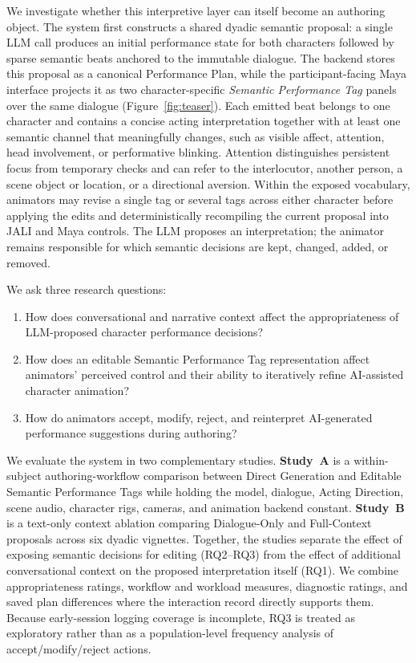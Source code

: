 We investigate whether this interpretive layer can itself become an authoring object. The system first constructs a shared dyadic semantic proposal: a single LLM call produces an initial performance state for both characters followed by sparse semantic beats anchored to the immutable dialogue. The backend stores this proposal as a canonical Performance Plan, while the participant-facing Maya interface projects it as two character-specific \textit{Semantic Performance Tag} panels over the same dialogue (Figure~\ref{fig:teaser}). Each emitted beat belongs to one character and contains a concise acting interpretation together with at least one semantic channel that meaningfully changes, such as visible affect, attention, head involvement, or performative blinking. Attention distinguishes persistent focus from temporary checks and can refer to the interlocutor, another person, a scene object or location, or a directional aversion. Within the exposed vocabulary, animators may revise a single tag or several tags across either character before applying the edits and deterministically recompiling the current proposal into JALI and Maya controls. The LLM proposes an interpretation; the animator remains responsible for which semantic decisions are kept, changed, added, or removed.

We ask three research questions:
\begin{enumerate}
    \item[\textbf{RQ1}] How does conversational and narrative context affect the appropriateness of LLM-proposed character performance decisions?
    \item[\textbf{RQ2}] How does an editable Semantic Performance Tag representation affect animators' perceived control and their ability to iteratively refine AI-assisted character animation?
    \item[\textbf{RQ3}] How do animators accept, modify, reject, and reinterpret AI-generated performance suggestions during authoring?
\end{enumerate}

We evaluate the system in two complementary studies. \textbf{Study~A} is a within-subject authoring-workflow comparison between Direct Generation and Editable Semantic Performance Tags while holding the model, dialogue, Acting Direction, scene audio, character rigs, cameras, and animation backend constant. \textbf{Study~B} is a text-only context ablation comparing Dialogue-Only and Full-Context proposals across six dyadic vignettes. Together, the studies separate the effect of exposing semantic decisions for editing (RQ2--RQ3) from the effect of additional conversational context on the proposed interpretation itself (RQ1). We combine appropriateness ratings, workflow and workload measures, diagnostic ratings, and saved plan differences where the interaction record directly supports them. Because early-session logging coverage is incomplete, RQ3 is treated as exploratory rather than as a population-level frequency analysis of accept/modify/reject actions.

